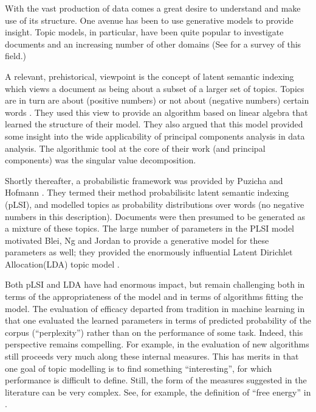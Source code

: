 
With the vast production of data comes a great desire
to understand and make use of its structure. One
avenue has been to use generative models to provide
insight.  Topic models, in particular,
have been quite popular to investigate documents
and an increasing number of other domains (See \cite{BleiCACM} for
a survey of this field.)


A relevant, prehistorical, viewpoint is the concept of latent semantic
indexing which views a document as being about a subset of a larger
set of topics.  Topics are in turn are about (positive numbers) or not
about (negative numbers) certain words \cite{Papadimitriou1997}.  They
used this view to provide an algorithm based on linear algebra that
learned the structure of their model.  They also argued that this
model provided some insight into the wide applicability of principal
components analysis in data analysis. The algorithmic tool at the
core of their work (and principal components) was the singular value
decomposition.

Shortly thereafter, a probabilistic framework was provided by Puzicha
and Hofmann \cite{Hofmann04}.  They termed their method probabilisitc latent
semantic indexing (pLSI), and modelled topics as probability
distributions over words (no negative numbers in this description).
Documents were then presumed to be generated as a mixture of these
topics.  The large number of parameters in the PLSI model motivated
Blei, Ng and Jordan to provide a generative model for these parameters
as well; they provided the enormously influential Latent Dirichlet
Allocation(LDA) topic model \cite{Blei2003a}.

Both pLSI and LDA have had enormous impact, but remain challenging
both in terms of the appropriateness of the model and in terms of
algorithms fitting the model.  The evaluation of efficacy departed
from tradition in machine learning in that one evaluated the learned
parameters in terms of predicted probability of the corpus
(``perplexity'') rather than on the performance of some task. Indeed,
this perspective remains compelling.  For example, in
\cite{BleiCBA} the evaluation of new algorithms still proceeds very
much along these internal measures.  This has merits in that one goal
of topic modelling is to find something ``interesting'', for which
performance is difficult to define.  Still, the form of the measures
suggested in the literature can be very complex.  See, for example,
the definition of ``free energy'' in \cite{BleiCBA}.
 
